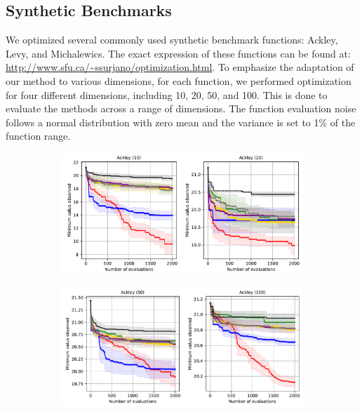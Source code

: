 \subsection{Synthetic Benchmarks}
We optimized several commonly used synthetic benchmark functions: Ackley, Levy, and Michalewics. The exact expression of these functions can be found at: \url{http://www.sfu.ca/~ssurjano/optimization.html}. To emphasize the adaptation of our method to various dimensions, for each function, we performed optimization for four different dimensions, including 10, 20, 50, and 100. This is done to evaluate the methods across a range of dimensions. The function evaluation noise follows a normal distribution with zero mean and the variance is set to 1\% of the function range.
\begin{figure}[]
    \centering
    \begin{subfigure}[b]{\textwidth}
        \centering
        \includegraphics[width=\textwidth]{Figures/Neural-BO/A1.pdf}
    \end{subfigure}
    \begin{subfigure}[b]{\textwidth}
        \centering
        \includegraphics[width=\textwidth]{Figures/Neural-BO/A2.pdf}
    \end{subfigure}
    \begin{subfigure}[b]{\textwidth}

\end{subfigure}
\end{figure}
